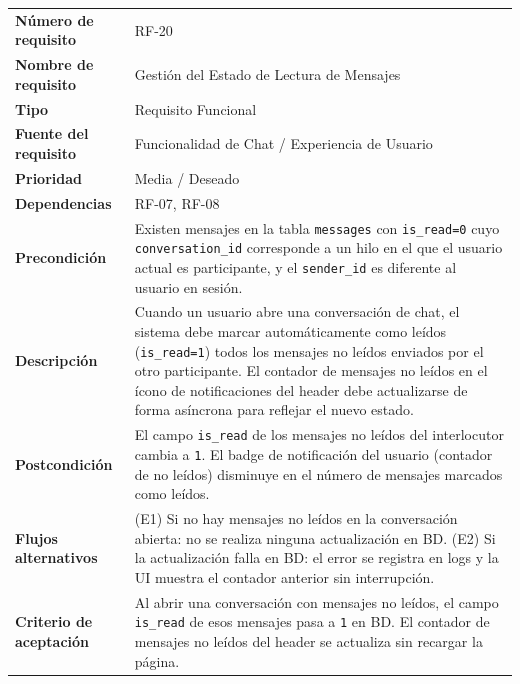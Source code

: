 \documentclass[11pt,a4paper]{report}
\begin{document}
\begin{table}[H]
\centering
\begin{tabularx}{\textwidth}{|l|L|}
\hline
{} \\ \hline
\textbf{Número de requisito} & RF-20 \\ \hline
\textbf{Nombre de requisito} & Gestión del Estado de Lectura de Mensajes \\ \hline
\textbf{Tipo} & Requisito Funcional \\ \hline
\textbf{Fuente del requisito} & Funcionalidad de Chat / Experiencia de Usuario \\ \hline
\textbf{Prioridad} & Media / Deseado \\ \hline
\textbf{Dependencias} & RF-07, RF-08 \\ \hline
\textbf{Precondición} & Existen mensajes en la tabla \texttt{messages} con \texttt{is\_read=0} cuyo \texttt{conversation\_id} corresponde a un hilo en el que el usuario actual es participante, y el \texttt{sender\_id} es diferente al usuario en sesión. \\ \hline
\textbf{Descripción} & Cuando un usuario abre una conversación de chat, el sistema debe marcar automáticamente como leídos (\texttt{is\_read=1}) todos los mensajes no leídos enviados por el otro participante. El contador de mensajes no leídos en el ícono de notificaciones del header debe actualizarse de forma asíncrona para reflejar el nuevo estado. \\ \hline
\textbf{Postcondición} & El campo \texttt{is\_read} de los mensajes no leídos del interlocutor cambia a \texttt{1}. El badge de notificación del usuario (contador de no leídos) disminuye en el número de mensajes marcados como leídos. \\ \hline
\textbf{Flujos alternativos} & (E1) Si no hay mensajes no leídos en la conversación abierta: no se realiza ninguna actualización en BD. (E2) Si la actualización falla en BD: el error se registra en logs y la UI muestra el contador anterior sin interrupción. \\ \hline
\textbf{Criterio de aceptación} & Al abrir una conversación con mensajes no leídos, el campo \texttt{is\_read} de esos mensajes pasa a \texttt{1} en BD. El contador de mensajes no leídos del header se actualiza sin recargar la página. \\ \hline
\end{tabularx}
\end{table}
\end{document}
